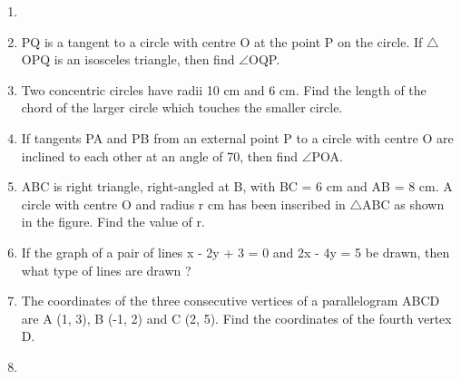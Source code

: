 \documentclass{exam}
\begin{document}
\begin{enumerate}
		\item

		\item PQ is a tangent to a circle with centre O at the point P on the circle. If $\triangle$OPQ is an isosceles triangle, then find $\angle$OQP. 
		
		\item Two concentric circles have radii 10 cm and 6 cm. Find the length of the chord of the larger circle which touches the smaller circle. 
		
		\item If tangents PA and PB from an external point P to a circle with centre O are inclined to each other at an angle of 70\textdegree, then find $\angle$POA. 
		
		\item ABC is right triangle, right-angled at B, with BC = 6 cm and AB = 8 cm. A circle with centre O and radius r cm has been inscribed in $\triangle$ABC as shown in the figure. Find the value of r. 
		

		\item If the graph of a pair of lines x - 2y + 3 = 0 and 2x - 4y = 5 be drawn, then what type of lines are drawn ? 
		
		\item The coordinates of the three consecutive vertices of a parallelogram ABCD are A (1, 3), B (-1, 2) and C (2, 5). Find the coordinates of the fourth vertex D. 
		
		\item
\end{enumerate}
\end{document}
